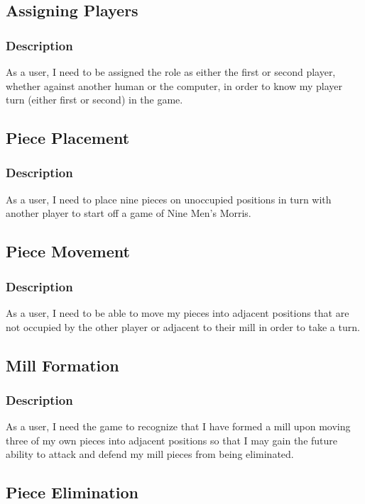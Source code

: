 \documentclass[11pt]{article}
\begin{document}
\subsection{Assigning Players}
\label{sec:org8bcf587}
\subsubsection*{Description}
\label{sec:orgd8de5f2}
As a user, I need to be assigned the role as either the first or second player, whether against
another human or the computer, in order to know my player turn (either first or second) in the
game.
\subsection{Piece Placement}
\label{sec:orgf670e5e}
\subsubsection*{Description}
\label{sec:orgda9412e}
As a user, I need to place nine pieces on unoccupied positions in turn with another player to
start off a game of Nine Men's Morris.
\subsection{Piece Movement}
\label{sec:orgbf75d4b}
\subsubsection*{Description}
\label{sec:org48683b5}
As a user, I need to be able to move my pieces into adjacent positions that are not occupied by
the other player or adjacent to their mill in order to take a turn.
\subsection{Mill Formation}
\label{sec:orgcc24bcb}
\subsubsection*{Description}
\label{sec:org1e4a969}
As a user, I need the game to recognize that I have formed a mill upon moving three of my own
pieces into adjacent positions so that I may gain the future ability to attack and defend my
mill pieces from being eliminated.
\subsection{Piece Elimination}
\label{sec:org9fd7aac}
\end{document}
